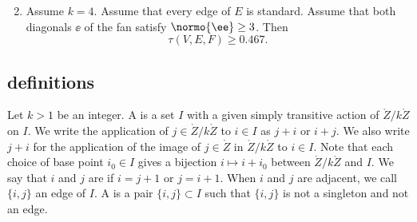 \begin{theorem}
\begin{enumerate}
\begin{equation}
\end{equation}
\item Assume $k=4$.  Assume that every edge of $E$ is standard.
Assume that both diagonals $\ee$ of the fan satisfy $\normo{\ee}\ge3$.
Then
\begin{equation}
\tau(V,E,F)\ge 0.467.\tag{check:quad\_diag\_cs}
\end{equation}
\end{enumerate}
\end{theorem}

%
%


\subsection{definitions}


\begin{definition}
  Let $k>1$ be an integer.  A  is a set $I$ with a
  given simply transitive action of $\ring{Z}/k\ring{Z}$ on $I$.  We
  write the application of $j\in\ring{Z}/k\ring{Z}$ to $i\in I$ as
  $j+i$ or $i+j$.  We also write $j+i$
  for the application of the image of $j\in\ring{Z}$ in $\ring{Z}/k\ring{Z}$ to
  $i\in I$.  Note that each choice of base point $i_0\in I$ gives a
  bijection $i\mapsto i+i_0$ between $\ring{Z}/k\ring{Z}$ and $I$.  
  We say that $i$ and $j$ are  if $i= j+ 1$ or $j=i+1$.
When $i$ and $j$ are adjacent, we call $\{i,j\}$ an edge of $I$.
 A  is a pair $\{i,j\}\subset I$
such that $\{i,j\}$ is not a singleton and not an edge.
%
\end{definition}

